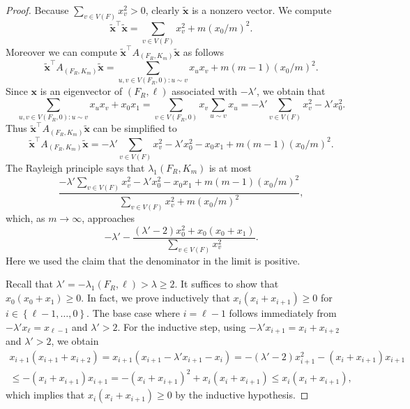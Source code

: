 \documentclass[10pt,a4paper]{amsart}
\newcommand{\T}{\intercal}
\newcommand{\bx}{\bm{x}}
\newcommand{\la}{\lambda}
\newcommand{\sset}[1]{\left\{{#1}\right\}}
\newcommand{\tbx}{\tilde{\bm{x}}}
\begin{document}
\begin{proof}
    Because $\sum_{v \in V(F)}x_v^2 > 0$, clearly $\tbx$ is a nonzero vector. We compute
    \[
        \tbx^\T \tbx = \sum_{v \in V(F)}x_v^2 + m(x_0/m)^2.
    \]
    Moreover we can compute $\tbx^\T A_{(F_R, K_m)}\tbx$ as follows
    \[
        \tbx^\T A_{(F_R, K_m)}\tbx = \sum_{u,v \in V(F_R, 0)\colon u\sim v}x_ux_v + m(m-1)(x_0/m)^2.
    \]
    Since $\bx$ is an eigenvector of $(F_R, \ell)$ associated with $-\la'$, we obtain that
    \[
        \sum_{u, v \in V(F_R, 0)\colon u\sim v} x_ux_v + x_0x_1 = \sum_{v \in V(F_R, 0)}x_v \sum_{u\sim v}x_u = -\la'\sum_{v \in V(F)}x_v^2 - \la' x_0^2.
    \]
    Thus $\tbx^\T A_{(F_R, K_m)}\tbx$ can be simplified to
    \[
        \tbx^\T A_{(F_R, K_m)}\tbx = -\la'\sum_{v \in V(F)}x_v^2 -\la'x_0^2 - x_0x_1 + m(m-1)(x_0/m)^2.
    \]
    The Rayleigh principle says that $\la_1(F_R, K_m)$ is at most
    \[
        \frac{-\la'\sum_{v \in V(F)}x_v^2 - \la'x_0^2 - x_0x_1 + m(m-1)(x_0/m)^2}{\sum_{v \in V(F)}x_v^2 + m(x_0/m)^2},
    \]
    which, as $m\to\infty$, approaches
    \[
        -\la' - \frac{(\la'-2)x_0^2+x_0(x_0 + x_1)}{\sum_{v \in V(F)}x_v^2}.
    \]
    Here we used the claim that the denominator in the limit is positive.

    Recall that $\la' = -\la_1(F_R, \ell) > \la \ge 2$. It suffices to show that $x_0(x_0 + x_1)\ge 0$. In fact, we prove inductively that $x_i(x_i + x_{i+1}) \ge 0$ for $i \in \sset{\ell-1, \dots, 0}$. The base case where $i = \ell-1$ follows immediately from $-\la' x_\ell = x_{\ell-1}$ and $\la' > 2$. For the inductive step, using $-\la' x_{i+1} = x_i + x_{i+2}$ and $\la' > 2$, we obtain
    \begin{multline*}
        x_{i+1}(x_{i+1} + x_{i+2}) = x_{i+1}(x_{i+1} - \la'x_{i+1}-x_i) = -(\la'-2)x_{i+1}^2 - (x_i + x_{i+1})x_{i+1} \\
        \le -(x_i + x_{i+1})x_{i+1} = -(x_i + x_{i+1})^2 + x_i(x_i + x_{i+1}) \le x_i(x_i + x_{i+1}),
    \end{multline*}
    which implies that $x_i(x_i+x_{i+1}) \ge 0$ by the inductive hypothesis.
\end{proof}
\end{document}
